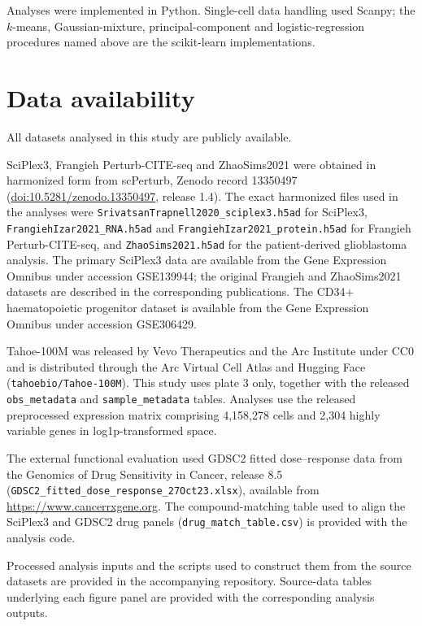 \documentclass[11pt,letterpaper]{article}
\begin{document}
Analyses were implemented in Python. Single-cell data handling used Scanpy\cite{Scanpy}; the
$k$-means, Gaussian-mixture, principal-component and logistic-regression procedures named above
are the scikit-learn implementations\cite{ScikitLearn}.


\section*{Data availability}

\sloppy

All datasets analysed in this study are publicly available.

SciPlex3, Frangieh Perturb-CITE-seq and ZhaoSims2021 were obtained in harmonized form
from scPerturb\cite{ref3}, Zenodo record 13350497
(\href{https://doi.org/10.5281/zenodo.13350497}{doi:10.5281/zenodo.13350497},
release 1.4). The exact harmonized files used in the analyses were
\texttt{SrivatsanTrapnell2020\_sciplex3.h5ad} for SciPlex3,
\texttt{FrangiehIzar2021\_RNA.h5ad} and
\texttt{FrangiehIzar2021\_protein.h5ad} for Frangieh Perturb-CITE-seq,
and \texttt{ZhaoSims2021.h5ad} for the patient-derived glioblastoma analysis.
The primary SciPlex3 data are available from the Gene Expression Omnibus under
accession GSE139944\cite{dataSciPlex3}; the original Frangieh and ZhaoSims2021
datasets are described in the corresponding publications\cite{dataFrangieh,dataZhao}.
The CD34$+$ haematopoietic progenitor dataset is available from the Gene Expression
Omnibus under accession GSE306429\cite{dataCD34}.

Tahoe-100M\cite{Tahoe100M} was released by Vevo Therapeutics and the Arc Institute
under CC0 and is distributed through the Arc Virtual Cell Atlas and Hugging Face
(\texttt{tahoebio/Tahoe-100M}). This study uses plate 3 only, together with the
released \texttt{obs\_metadata} and \texttt{sample\_metadata} tables. Analyses use
the released preprocessed expression matrix comprising 4,158,278 cells and 2,304
highly variable genes in log1p-transformed space.

The external functional evaluation used GDSC2 fitted dose--response data from the
Genomics of Drug Sensitivity in Cancer, release 8.5
(\texttt{GDSC2\_fitted\_dose\_response\_27Oct23.xlsx}), available from
\url{https://www.cancerrxgene.org}. The compound-matching table used to align the
SciPlex3 and GDSC2 drug panels (\texttt{drug\_match\_table.csv}) is provided with the
analysis code.

Processed analysis inputs and the scripts used to construct them from the source
datasets are provided in the accompanying repository. Source-data tables underlying
each figure panel are provided with the corresponding analysis outputs.
\end{document}
